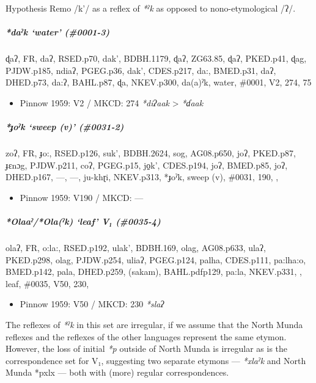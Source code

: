 \documentclass[a4paper,]{article}
\providecommand{\tightlist}{%
  \setlength{\itemsep}{0pt}\setlength{\parskip}{0pt}}
\let\oldsubparagraph\subparagraph
\renewcommand{\subparagraph}[1]{\oldsubparagraph{#1}\mbox{}}
\begin{document}
Hypothesis Remo /k'/ as a reflex of \emph{*ˀk} as opposed to
nono-etymological /ʔ/.

\subparagraph{\texorpdfstring{\emph{*daˀk} `water'
(\#0001-3)}{*daˀk water (\#0001-3)}}\label{daux2c0k-water-0001-3}

ɖaʔ, FR, daʔ, RSED.p70, dak', BDBH.1179, ɖaʔ, ZG63.85, ɖaʔ, PKED.p41,
ɖag, PJDW.p185, ndiaʔ, PGEG.p36, dak', CDES.p217, da:, BMED.p31, daʔ,
DHED.p73, da:ʔ, BAHL.p87, ɖa, NKEV.p300, da(a)ˀk, water, \#0001, V2,
274, 75

\begin{itemize}
\tightlist
\item
  Pinnow 1959: V2 / MKCD: 274 \emph{*diʔaak} \textgreater{} \emph{*ɗaak}
\end{itemize}

\subparagraph{\texorpdfstring{\emph{*ɟoˀk} `sweep (v)'
(\#0031-2)}{*ɟoˀk sweep (v) (\#0031-2)}}\label{ux25foux2c0k-sweep-v-0031-2-1}

zoʔ, FR, ɟo:, RSED.p126, suk', BDBH.2624, sog, AG08.p650, joʔ, PKED.p87,
ɟɛnɔg, PJDW.p211, coʔ, PGEG.p15, jo̠k', CDES.p194, joʔ, BMED.p85, joʔ,
DHED.p167, ---, ---, ju-khɽi, NKEV.p313, *ɟoˀk, sweep (v), \#0031, 190,
,

\begin{itemize}
\tightlist
\item
  Pinnow 1959: V190 / MKCD: ---
\end{itemize}

\subparagraph{\texorpdfstring{\emph{*Olaaˀ}/\emph{*Ola(ˀk)} `leaf' V₁
(\#0035-4)}{*Olaaˀ/*Ola(ˀk) leaf V₁ (\#0035-4)}}\label{olaaux2c0olaux2c0k-leaf-v-0035-4}

olaʔ, FR, o:la:, RSED.p192, ulak', BDBH.169, olag, AG08.p633, ulaʔ,
PKED.p298, olag, PJDW.p254, uliaʔ, PGEG.p124, palha, CDES.p111,
pa:lha:o, BMED.p142, pala, DHED.p259, (sakam), BAHL.pdfp129, pa:la,
NKEV.p331, , leaf, \#0035, V50, 230,

\begin{itemize}
\tightlist
\item
  Pinnow 1959: V50 / MKCD: 230 \emph{*slaʔ}
\end{itemize}

The reflexes of \emph{*ˀk} in this set are irregular, if we assume that
the North Munda reflexes and the reflexes of the other languages
represent the same etymon. However, the loss of initial \emph{*p}
outside of North Munda is irregular as is the correspondence set for V₁,
suggesting two separate etymons --- \emph{*xlaˀk} and North Munda *pxlx
--- both with (more) regular correspondences.
\end{document}
